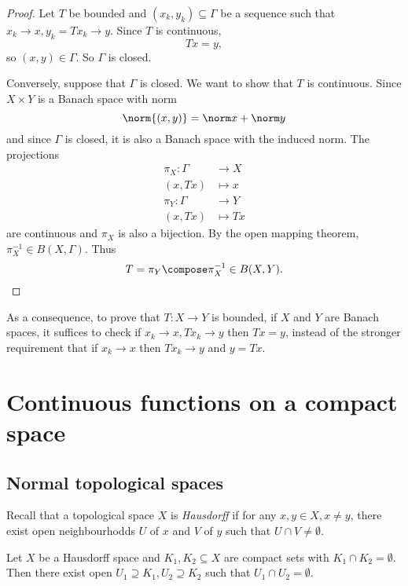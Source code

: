 \documentclass[a4paper]{article}
\begin{document}
\begin{proof}
  Let \(T\) be bounded and \((x_k, y_k) \subseteq \Gamma\) be a sequence such that \(x_k \to x, y_k = Tx_k \to y\). Since \(T\) is continuous,
  \[
    Tx = y,
  \]
  so \((x, y) \in \Gamma\). So \(\Gamma\) is closed.

  Conversely, suppose that \(\Gamma\) is closed. We want to show that \(T\) is continuous. Since \(X \times Y\) is a Banach space with norm
  \[
    \norm{(x, y)} = \norm x + \norm y
  \]
  and since \(\Gamma\) is closed, it is also a Banach space with the induced norm. The projections
  \begin{align*}
    \pi_X: \Gamma &\to X \\
    (x, Tx) &\mapsto x \\
    \pi_Y: \Gamma &\to Y \\
    (x, Tx) &\mapsto Tx
  \end{align*}
  are continuous and \(\pi_X\) is also a bijection. By the open mapping theorem, \(\pi_X^{-1} \in B(X, \Gamma)\). Thus
  \[
    T = \pi_Y \compose \pi_X^{-1} \in B(X, Y).
  \]
\end{proof}

\begin{remark}
  As a consequence, to prove that \(T: X \to Y\) is bounded, if \(X\) and \(Y\) are Banach spaces, it suffices to check if \(x_k \to x, Tx_k \to y\) then \(Tx = y\), instead of the stronger requirement that if \(x_k \to x\) then \(Tx_k \to y\) and \(y = Tx\).
\end{remark}

\section{Continuous functions on a compact space}

\subsection{Normal topological spaces}

Recall that a topological space \(X\) is \emph{Hausdorff} if for any \(x, y \in X, x \neq y\), there exist open neighbourhodds \(U\) of \(x\) and \(V\) of \(y\) such that \(U \cap V \neq \emptyset\).

\begin{proposition}
  Let \(X\) be a Hausdorff space and \(K_1, K_2 \subseteq X\) are compact sets with \(K_1 \cap K_2 = \emptyset\). Then there exist open \(U_1 \supseteq K_1, U_2 \supseteq K_2\) such that \(U_1 \cap U_2 = \emptyset\).
\end{proposition}
\end{document}
